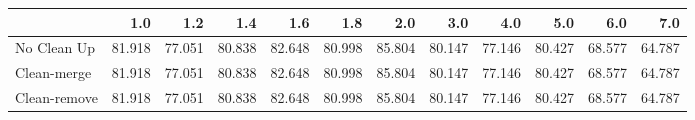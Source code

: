\begin{tabular}{lrrrrrrrrrrr}
\toprule
{} &    1.0 &    1.2 &    1.4 &    1.6 &    1.8 &    2.0 &    3.0 &    4.0 &    5.0 &    6.0 &    7.0 \\
\midrule
No Clean Up  & 81.918 & 77.051 & 80.838 & 82.648 & 80.998 & 85.804 & 80.147 & 77.146 & 80.427 & 68.577 & 64.787 \\
Clean-merge  & 81.918 & 77.051 & 80.838 & 82.648 & 80.998 & 85.804 & 80.147 & 77.146 & 80.427 & 68.577 & 64.787 \\
Clean-remove & 81.918 & 77.051 & 80.838 & 82.648 & 80.998 & 85.804 & 80.147 & 77.146 & 80.427 & 68.577 & 64.787 \\
\bottomrule
\end{tabular}
